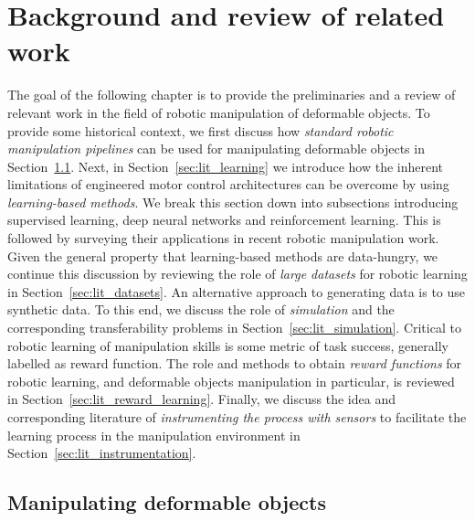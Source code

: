 \documentclass[\home/main.tex]{subfiles}
\begin{document}
\chapter{Background and review of related work} \label{ch:lit}

The goal of the following chapter is to provide the preliminaries and a review of relevant work in the field of robotic manipulation of deformable objects. To provide some historical context, we first discuss how \emph{standard robotic manipulation pipelines} can be used for manipulating deformable objects in Section~\ref{sec:lit_traditional}. Next, in Section~\ref{sec:lit_learning} we introduce how the inherent limitations of engineered motor control architectures can be overcome by using \emph{learning-based methods}. We break this section down into subsections introducing supervised learning, deep neural networks and reinforcement learning. This is followed by surveying their applications in recent robotic manipulation work. Given the general property that learning-based methods are data-hungry, we continue this discussion by reviewing the role of \emph{large datasets} for robotic learning in Section~\ref{sec:lit_datasets}. An alternative approach to generating data is to use synthetic data. To this end, we discuss the role of \emph{simulation} and the corresponding transferability problems in Section~\ref{sec:lit_simulation}. Critical to robotic learning of manipulation skills is some metric of task success, generally labelled as reward function. The role and methods to obtain \emph{reward functions} for robotic learning, and deformable objects manipulation in particular, is reviewed in Section~\ref{sec:lit_reward_learning}. Finally, we discuss the idea and corresponding literature of \emph{instrumenting the process with sensors} to facilitate the learning process in the manipulation environment in Section~\ref{sec:lit_instrumentation}.


\section{Manipulating deformable objects} \label{sec:lit_traditional}
\end{document}
